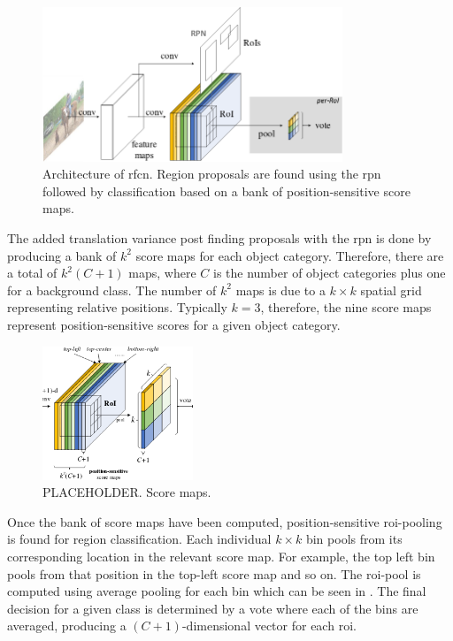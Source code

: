 \begin{figure}[H]
  \centering
    \includegraphics[width=0.8\textwidth]{Figs/Techanal/rfcnarchi.png}
      \caption{Architecture of \gls{rfcn}. Region proposals are found using the \gls{rpn} followed by classification based on a bank of position-sensitive score maps.}
    \label{fig:rfcnarch}
\end{figure}

The added translation variance post finding proposals with the \gls{rpn} is done by producing a bank of $k^2$ score maps for each object category. Therefore, there are a total of $k^2(C + 1)$ maps, where $C$ is the number of object categories plus one for a background class. The number of $k^2$ maps is due to a $k \times k$ spatial grid representing relative positions. Typically $k = 3$, therefore, the nine score maps represent position-sensitive scores for a given object category.

\begin{figure}[H]
  \centering
    \includegraphics[width=0.4\textwidth]{Figs/Techanal/scoremaps.png}
     \caption{PLACEHOLDER. Score maps.}
    \label{fig:scoremaps}
\end{figure}

Once the bank of score maps have been computed, position-sensitive \gls{roi}-pooling is found for region classification. Each individual $k \times k$ bin pools from its corresponding location in the relevant score map. For example, the top left bin pools from that position in the top-left score map and so on. The \gls{roi}-pool is computed using average pooling for each bin which can be seen in . The final decision for a given class is determined by a vote where each of the bins are averaged, producing a $(C+1)$-dimensional vector for each \gls{roi}.

